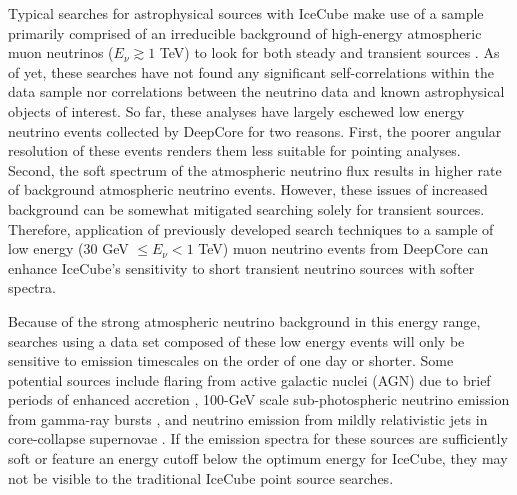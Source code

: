\documentclass[manuscript]{aastex}
\begin{document}
Typical searches for astrophysical sources with IceCube make use of a sample primarily comprised of an irreducible background of high-energy atmospheric muon neutrinos ($E_{\nu} \gtrsim 1$ TeV) to look for both steady \citep{2014ApJ...796..109A} and transient sources \citep{2015arXiv150300598A}. As of yet, these searches have not found any significant self-correlations within the data sample nor correlations between the neutrino data and known astrophysical objects of interest. So far, these analyses have largely eschewed low energy neutrino events collected by DeepCore for two reasons. First, the poorer angular resolution of these events renders them less suitable for pointing analyses. Second, the soft spectrum of the atmospheric neutrino flux results in higher rate of background atmospheric neutrino events. However, these issues of increased background can be somewhat mitigated searching solely for transient sources. Therefore, application of previously developed search techniques to a sample of low energy (30 GeV $\leq E_{\nu} < 1$ TeV) muon neutrino events from DeepCore can enhance IceCube's sensitivity to short transient neutrino sources with softer spectra.

Because of the strong atmospheric neutrino background in this energy range, searches using a data set composed of these low energy events will only be sensitive to emission timescales on the order of one day or shorter. Some potential sources include flaring from active galactic nuclei (AGN) due to brief periods of enhanced accretion \citep{2009APh....31..138B}, 100-GeV scale sub-photospheric neutrino emission from gamma-ray bursts \citep{2013PhRvL.111m1102M}, and neutrino emission from mildly relativistic jets in core-collapse supernovae \citep{2005MPLA...20.2351R}. If the emission spectra for these sources are sufficiently soft or feature an energy cutoff below the optimum energy for IceCube, they may not be visible to the traditional IceCube point source searches.
\end{document}
